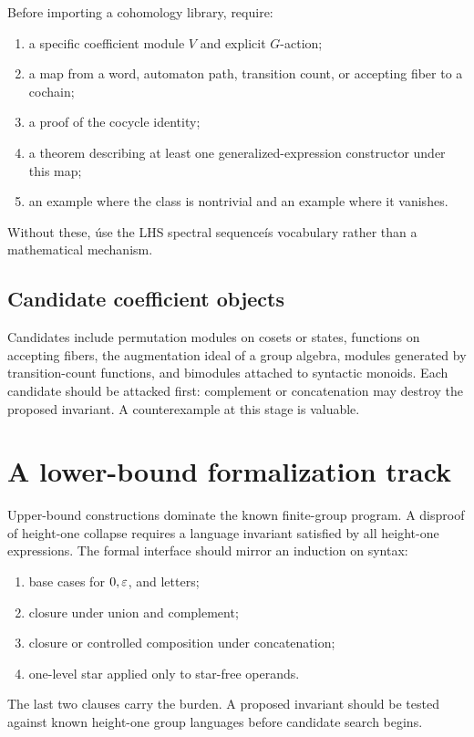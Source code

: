 \documentclass{amsart}
\begin{document}
Before importing a cohomology library, require:
\begin{enumerate}
  \item a specific coefficient module $V$ and explicit $G$-action;
  \item a map from a word, automaton path, transition count, or accepting fiber to a cochain;
  \item a proof of the cocycle identity;
  \item a theorem describing at least one generalized-expression constructor under this map;
  \item an example where the class is nontrivial and an example where it vanishes.
\end{enumerate}
Without these, \'use the LHS spectral sequence\' is vocabulary rather than a mathematical mechanism.

\subsection{Candidate coefficient objects}

Candidates include permutation modules on cosets or states, functions on accepting fibers, the augmentation ideal of a group algebra, modules generated by transition-count functions, and bimodules attached to syntactic monoids.  Each candidate should be attacked first: complement or concatenation may destroy the proposed invariant.  A counterexample at this stage is valuable.

\section{A lower-bound formalization track}

Upper-bound constructions dominate the known finite-group program.  A disproof of height-one collapse requires a language invariant satisfied by all height-one expressions.  The formal interface should mirror an induction on syntax:
\begin{enumerate}
  \item base cases for $0,\varepsilon$, and letters;
  \item closure under union and complement;
  \item closure or controlled composition under concatenation;
  \item one-level star applied only to star-free operands.
\end{enumerate}
The last two clauses carry the burden.  A proposed invariant should be tested against known height-one group languages before candidate search begins.
\end{document}
